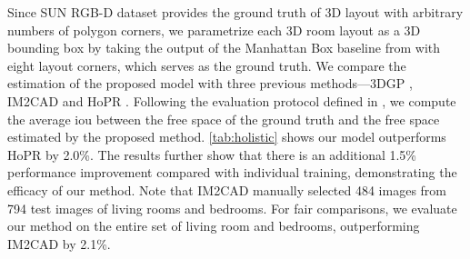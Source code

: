\documentclass{article}
\begin{document}
Since SUN RGB-D dataset provides the ground truth of 3D layout with arbitrary numbers of polygon corners, we parametrize each 3D room layout as a 3D bounding box by taking the output of the Manhattan Box baseline from \citep{song2015sun} with eight layout corners, which serves as the ground truth. We compare the estimation of the proposed model with three previous methods---3DGP \citep{choi2013understanding}, IM2CAD \citep{izadinia2016im2cad} and HoPR \citep{huang2018holistic}. Following the evaluation protocol defined in \citep{song2015sun}, we compute the average \ac{iou} between the free space of the ground truth and the free space estimated by the proposed method. \autoref{tab:holistic} shows our model outperforms HoPR by 2.0\%. The results further show that there is an additional 1.5\% performance improvement compared with individual training, demonstrating the efficacy of our method. Note that IM2CAD \citep{izadinia2016im2cad} manually selected 484 images from 794 test images of living rooms and bedrooms. For fair comparisons, we evaluate our method on the entire set of living room and bedrooms, outperforming IM2CAD by 2.1\%.
\end{document}
